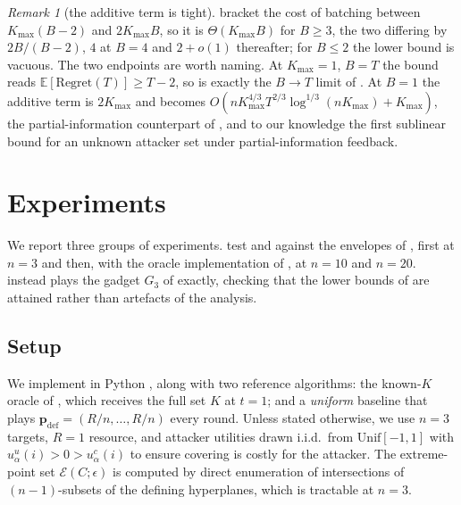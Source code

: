 \documentclass[letterpaper,9pt,twocolumn]{extarticle}
\newcommand{\pvec}{\mathbf{p}}
\newcommand{\cE}{\mathcal{E}}
\newcommand{\EE}{\mathbb{E}}
\newcommand{\Kmax}{K_{\max}}
\newcommand{\Regret}{\mathrm{Regret}}
\theoremstyle{plain}
\theoremstyle{definition}
\theoremstyle{remark}
\newtheorem{remark}[theorem]{Remark}
\begin{document}
\begin{remark}[the additive term is tight]
\label{rem:blocktight}
 bracket the cost of batching between
$\Kmax(B-2)$ and $2\Kmax B$, so it is $\Theta(\Kmax B)$ for $B\ge 3$, the two
differing by $2B/(B-2)$, $4$ at $B=4$ and $2+o(1)$ thereafter; for $B\le 2$
the lower bound is vacuous. The two endpoints are worth naming. At $\Kmax=1$,
$B=T$ the bound reads $\EE[\Regret(T)]\ge T-2$, so  is
exactly the $B\to T$ limit of . At $B=1$ the additive term
is $2\Kmax$ and  becomes
$O(n\Kmax^{4/3}T^{2/3}\log^{1/3}(n\Kmax)+\Kmax)$, the
partial-information counterpart of , and to our knowledge
the first sublinear bound for an unknown attacker set under
partial-information feedback.
\end{remark}

\section{Experiments}
\label{sec:exp}
\label{sec:exp2}

We report three groups of experiments.
 test  and 
against the envelopes of , first at $n=3$ and
then, with the oracle implementation of , at $n=10$ and
$n=20$.  instead plays the gadget $G_3$ of
 exactly, checking that the lower bounds of
 are attained rather than
artefacts of the analysis.

\subsection{Setup}

We implement  in Python 
, along
with two reference algorithms: the known-$K$ oracle of
\citet[Sec.~5]{balcan2015}, which receives the full set $K$ at $t=1$; and a
\emph{uniform} baseline that plays $\pvec_{\text{def}}=(R/n,\dots,R/n)$
every round. Unless stated otherwise, we use $n=3$ targets, $R=1$
resource, and attacker utilities drawn i.i.d.\ from $\mathrm{Unif}[-1,1]$
with $u_\alpha^u(i)>0>u_\alpha^c(i)$ to ensure covering is costly for the
attacker. The extreme-point set $\cE(C;\epsilon)$ is computed by direct
enumeration of intersections of $(n-1)$-subsets of the defining
hyperplanes, which is tractable at $n=3$.
\end{document}
